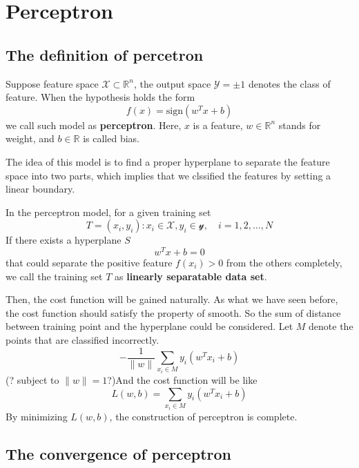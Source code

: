 \chapter{Perceptron}

\section{The definition of percetron}

\begin{define}[Perceptron]
    Suppose feature space $\mathcal{X}\subset\mathbb{R}^n$, the output space $\mathcal{Y}={\pm 1}$ denotes the class of feature. When the hypothesis holds the form
    \[f(x)= \text{sign}(w^Tx+b)\]
    we call such model as \textbf{perceptron}. Here, $x$ is a feature, $w\in \mathbb{R}^n$ stands for weight, and $b \in \mathbb{R}$ is called bias.
\end{define}

The idea of this model is to find a proper hyperplane to separate the feature space into two parts, which implies that we clssified the features by setting a linear boundary.

\begin{define}
    In the perceptron model, for a given training set 
    \[T={(x_i,y_i):x_i\in \mathcal{X},y_i\in\mathcal{y},\quad i=1,2,\ldots,N}\]
    If there exists a hyperplane $S$
    \[w^Tx+b=0\]
    that could separate the positive feature $f(x_i)>0$ from the others completely, we call the training set $T$ as \textbf{linearly separatable data set}. 
\end{define}

Then, the cost function will be gained naturally. As what we have seen before, the cost function should satisfy the property of smooth. So the sum of distance between training point and the hyperplane
could be considered. Let $M$ denote the points that are classified incorrectly.
\[-\frac{1}{\lVert w\rVert}\sum_{x_i\in M} y_i(w^Tx_i+b)\]
(? subject to $\lVert w\rVert=1$?)And the cost function will be like
\[L(w,b)=\sum_{x_i\in M} y_i(w^Tx_i+b)\]
By minimizing $L(w,b)$, the construction of perceptron is complete.

\section{The convergence of perceptron}

